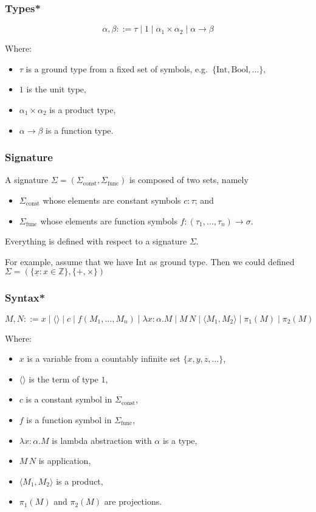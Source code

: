 \documentclass[aspectratio=169]{beamer}
\begin{document}
\begin{frame}
\frametitle{Types*}
\[
\alpha, \beta ::= \tau \mid 1 \mid \alpha_1 \times \alpha_2 \mid \alpha \rightarrow \beta
\]

Where:
\begin{itemize}
    \item $\tau$ is a ground type from a fixed set of symbols, e.g.\ $\{\text{Int}, \text{Bool}, \ldots\},$
    \item $1$ is the unit type,
    \item $\alpha_1 \times \alpha_2$ is a product type,
    \item $\alpha \rightarrow \beta$ is a function type.
\end{itemize}
\end{frame}

\begin{frame}
\frametitle{Signature}
A signature $\Sigma = (\Sigma_{\text{const}}, \Sigma_{\text{func}})$ is composed of two sets, namely
\begin{itemize}
    \item $\Sigma_{\text{const}}$ whose elements are constant symbols $c : \tau$; and
    \item $\Sigma_{\text{func}}$ whose elements are function symbols $f : (\tau_1, \ldots, \tau_n) \to \sigma$.
\end{itemize}
Everything is defined with respect to a signature $\Sigma$.

\medskip

For example, assume that we have $\text{Int}$ as ground type.
Then we could defined $\Sigma = \left(\{\underline{x} : x \in \mathbb{Z}\}, \{+, \times\}\right)$ 

\end{frame}

\begin{frame}
\frametitle{Syntax*}

\[
M, N ::= x \mid \langle \rangle \mid c \mid f(M_1, \ldots, M_n) \mid \lambda x: \alpha. M \mid M \, N \mid \langle M_1, M_2 \rangle \mid \pi_1(M) \mid \pi_2(M)
\]

Where:
\begin{itemize}
    \item $x$ is a variable from a countably infinite set $\{x, y, z, \ldots \}$,
    \item $\langle \rangle$ is the term of type $1$,
    \item $c$ is a constant symbol in $\Sigma_{\text{const}}$,
    \item $f$ is a function symbol in $\Sigma_{\text{func}}$,
    \item $\lambda x: \alpha. M$ is lambda abstraction with $\alpha$ is a type,
    \item $M\, N$ is application,
    \item $\langle M_1, M_2 \rangle$ is a product,
    \item $\pi_1(M)$ and $\pi_2(M)$ are projections.
\end{itemize}
\end{frame}
\end{document}
